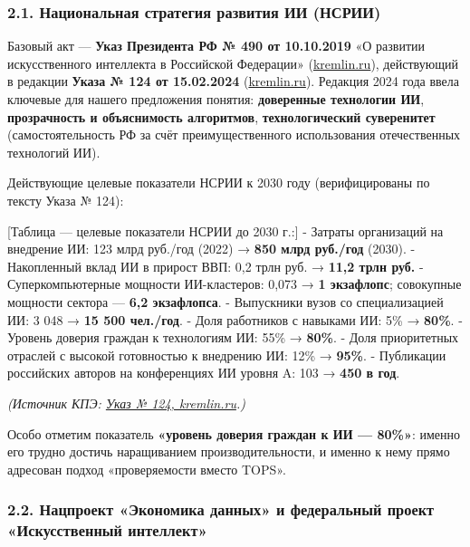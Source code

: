 \documentclass[
  russian,
]{article}
\begin{document}
\subsubsection{2.1. Национальная стратегия развития ИИ
(НСРИИ)}\label{ux43dux430ux446ux438ux43eux43dux430ux43bux44cux43dux430ux44f-ux441ux442ux440ux430ux442ux435ux433ux438ux44f-ux440ux430ux437ux432ux438ux442ux438ux44f-ux438ux438-ux43dux441ux440ux438ux438}

Базовый акт --- \textbf{Указ Президента РФ № 490 от 10.10.2019} «О
развитии искусственного интеллекта в Российской Федерации»
(\href{http://www.kremlin.ru/acts/bank/44731}{kremlin.ru}), действующий
в редакции \textbf{Указа № 124 от 15.02.2024}
(\href{http://www.kremlin.ru/acts/bank/50326}{kremlin.ru}). Редакция
2024 года ввела ключевые для нашего предложения понятия:
\textbf{доверенные технологии ИИ}, \textbf{прозрачность и объяснимость
алгоритмов}, \textbf{технологический суверенитет} (самостоятельность РФ
за счёт преимущественного использования отечественных технологий ИИ).

Действующие целевые показатели НСРИИ к 2030 году (верифицированы по
тексту Указа № 124):

{[}Таблица --- целевые показатели НСРИИ до 2030 г.:{]} - Затраты
организаций на внедрение ИИ: 123 млрд руб./год (2022) → \textbf{850 млрд
руб./год} (2030). - Накопленный вклад ИИ в прирост ВВП: 0,2 трлн руб. →
\textbf{11,2 трлн руб.} - Суперкомпьютерные мощности ИИ-кластеров: 0,073
→ \textbf{1 экзафлопс}; совокупные мощности сектора --- \textbf{6,2
экзафлопса}. - Выпускники вузов со специализацией ИИ: 3 048 → \textbf{15
500 чел./год}. - Доля работников с навыками ИИ: 5\% → \textbf{80\%}. -
Уровень доверия граждан к технологиям ИИ: 55\% → \textbf{80\%}. - Доля
приоритетных отраслей с высокой готовностью к внедрению ИИ: 12\% →
\textbf{95\%}. - Публикации российских авторов на конференциях ИИ уровня
A: 103 → \textbf{450 в год}.

\emph{(Источник КПЭ: \href{http://www.kremlin.ru/acts/bank/50326}{Указ №
124, kremlin.ru}.)}

Особо отметим показатель \textbf{«уровень доверия граждан к ИИ ---
80\%»}: именно его трудно достичь наращиванием производительности, и
именно к нему прямо адресован подход «проверяемости вместо TOPS».

\subsubsection{2.2. Нацпроект «Экономика данных» и федеральный проект
«Искусственный
интеллект»}\label{ux43dux430ux446ux43fux440ux43eux435ux43aux442-ux44dux43aux43eux43dux43eux43cux438ux43aux430-ux434ux430ux43dux43dux44bux445-ux438-ux444ux435ux434ux435ux440ux430ux43bux44cux43dux44bux439-ux43fux440ux43eux435ux43aux442-ux438ux441ux43aux443ux441ux441ux442ux432ux435ux43dux43dux44bux439-ux438ux43dux442ux435ux43bux43bux435ux43aux442}
\end{document}
